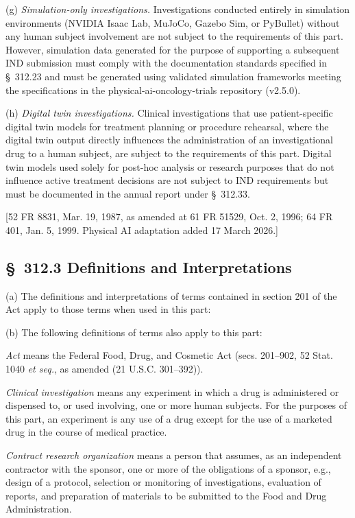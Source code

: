 \documentclass[11pt]{article}
\begin{document}
(g) \textit{Simulation-only investigations.} Investigations conducted entirely in simulation environments (NVIDIA Isaac Lab, MuJoCo, Gazebo Sim, or PyBullet) without any human subject involvement are not subject to the requirements of this part. However, simulation data generated for the purpose of supporting a subsequent IND submission must comply with the documentation standards specified in \S~312.23 and must be generated using validated simulation frameworks meeting the specifications in the physical-ai-oncology-trials repository (v2.5.0).

(h) \textit{Digital twin investigations.} Clinical investigations that use patient-specific digital twin models for treatment planning or procedure rehearsal, where the digital twin output directly influences the administration of an investigational drug to a human subject, are subject to the requirements of this part. Digital twin models used solely for post-hoc analysis or research purposes that do not influence active treatment decisions are not subject to IND requirements but must be documented in the annual report under \S~312.33.

[52 FR 8831, Mar. 19, 1987, as amended at 61 FR 51529, Oct. 2, 1996; 64 FR 401, Jan. 5, 1999. Physical AI adaptation added 17 March 2026.]

\subsection{\S~312.3 Definitions and Interpretations}

(a) The definitions and interpretations of terms contained in section 201 of the Act apply to those terms when used in this part:

(b) The following definitions of terms also apply to this part:

\textit{Act} means the Federal Food, Drug, and Cosmetic Act (secs. 201--902, 52 Stat. 1040 \textit{et seq.}, as amended (21 U.S.C. 301--392)).

\textit{Clinical investigation} means any experiment in which a drug is administered or dispensed to, or used involving, one or more human subjects. For the purposes of this part, an experiment is any use of a drug except for the use of a marketed drug in the course of medical practice.

\textit{Contract research organization} means a person that assumes, as an independent contractor with the sponsor, one or more of the obligations of a sponsor, e.g., design of a protocol, selection or monitoring of investigations, evaluation of reports, and preparation of materials to be submitted to the Food and Drug Administration.
\end{document}

